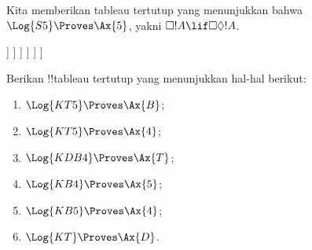 \documentclass[../../../include/open-logic-section]{subfiles}
\begin{document}
\begin{ex}
  Kita memberikan tableau tertutup yang menunjukkan bahwa
  $\Log{S5} \Proves \Ax{5}$, yakni $\Box!A \lif \Box\Diamond!A$.
  \begin{oltableau}
    [\pFmla{\False}{\Box\formula{A} \lif \Box\Diamond \formula{A}}{1},
      just = \TAss
      [\pFmla{\True}{\Box \formula{A}}{1}, just = {\TRule{\False}{\lif}[1]}
        [\pFmla{\False}{\Box\Diamond \formula{A}}{1},
          just = {\TRule{\False}{\lif}[1]}
          [\pFmla{\False}{\Diamond \formula{A}}{1.1},
            just = {\TRule{\False}{\Box}[3]}
            [\pFmla{\False}{\Diamond \formula{A}}{1},
              just = {4r$\Diamond$ 4}
              [\pFmla{\False}{\formula{A}}{1.1},
                just = {\TRule{\False}{\Diamond}[5]}
                [\pFmla{\True}{\formula{A}}{1.1},
                  just = {\TRule{\True}{\Box}[2]}, close]
              ]
            ]
          ]
        ]
      ]
    ]
  \end{oltableau}
\end{ex}

\begin{prob}
Berikan !!{tableau} tertutup yang menunjukkan hal-hal berikut:
  \begin{enumerate}
  \item $\Log{KT5} \Proves \Ax{B}$;
  \item $\Log{KT5} \Proves \Ax{4}$;
  \item $\Log{KDB4} \Proves \Ax{T}$;
  \item $\Log{KB4} \Proves \Ax{5}$;
  \item $\Log{KB5} \Proves \Ax{4}$;
  \item $\Log{KT} \Proves \Ax{D}$.
  \end{enumerate}
\end{prob}
\end{document}
